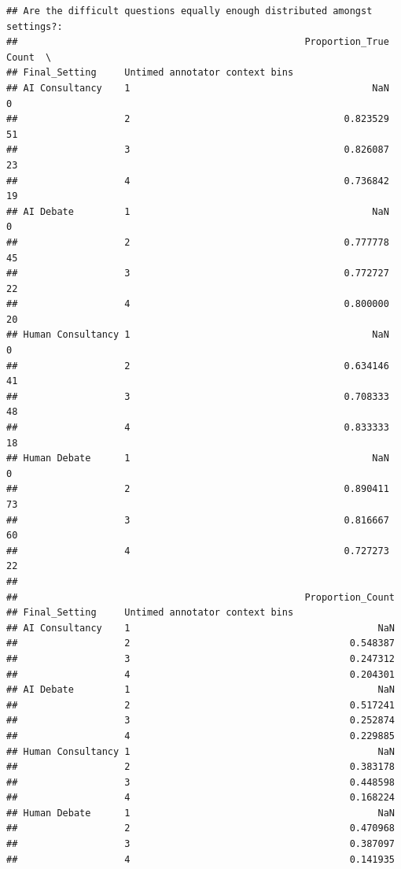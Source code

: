 \documentclass[
]{article}
\begin{document}
\begin{verbatim}
## Are the difficult questions equally enough distributed amongst settings?:
##                                                   Proportion_True  Count  \
## Final_Setting     Untimed annotator context bins                           
## AI Consultancy    1                                           NaN      0   
##                   2                                      0.823529     51   
##                   3                                      0.826087     23   
##                   4                                      0.736842     19   
## AI Debate         1                                           NaN      0   
##                   2                                      0.777778     45   
##                   3                                      0.772727     22   
##                   4                                      0.800000     20   
## Human Consultancy 1                                           NaN      0   
##                   2                                      0.634146     41   
##                   3                                      0.708333     48   
##                   4                                      0.833333     18   
## Human Debate      1                                           NaN      0   
##                   2                                      0.890411     73   
##                   3                                      0.816667     60   
##                   4                                      0.727273     22   
## 
##                                                   Proportion_Count  
## Final_Setting     Untimed annotator context bins                    
## AI Consultancy    1                                            NaN  
##                   2                                       0.548387  
##                   3                                       0.247312  
##                   4                                       0.204301  
## AI Debate         1                                            NaN  
##                   2                                       0.517241  
##                   3                                       0.252874  
##                   4                                       0.229885  
## Human Consultancy 1                                            NaN  
##                   2                                       0.383178  
##                   3                                       0.448598  
##                   4                                       0.168224  
## Human Debate      1                                            NaN  
##                   2                                       0.470968  
##                   3                                       0.387097  
##                   4                                       0.141935
\end{verbatim}
\end{document}
